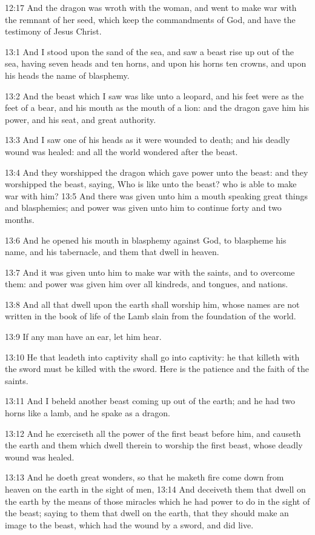 12:17 And the dragon was wroth with the woman, and went to make war
with the remnant of her seed, which keep the commandments of God, and
have the testimony of Jesus Christ.

13:1 And I stood upon the sand of the sea, and saw a beast rise up out
of the sea, having seven heads and ten horns, and upon his horns ten
crowns, and upon his heads the name of blasphemy.

13:2 And the beast which I saw was like unto a leopard, and his feet
were as the feet of a bear, and his mouth as the mouth of a lion: and
the dragon gave him his power, and his seat, and great authority.

13:3 And I saw one of his heads as it were wounded to death; and his
deadly wound was healed: and all the world wondered after the beast.

13:4 And they worshipped the dragon which gave power unto the beast:
and they worshipped the beast, saying, Who is like unto the beast? who
is able to make war with him?  13:5 And there was given unto him a
mouth speaking great things and blasphemies; and power was given unto
him to continue forty and two months.

13:6 And he opened his mouth in blasphemy against God, to blaspheme
his name, and his tabernacle, and them that dwell in heaven.

13:7 And it was given unto him to make war with the saints, and to
overcome them: and power was given him over all kindreds, and tongues,
and nations.

13:8 And all that dwell upon the earth shall worship him, whose names
are not written in the book of life of the Lamb slain from the
foundation of the world.

13:9 If any man have an ear, let him hear.

13:10 He that leadeth into captivity shall go into captivity: he that
killeth with the sword must be killed with the sword. Here is the
patience and the faith of the saints.

13:11 And I beheld another beast coming up out of the earth; and he
had two horns like a lamb, and he spake as a dragon.

13:12 And he exerciseth all the power of the first beast before him,
and causeth the earth and them which dwell therein to worship the
first beast, whose deadly wound was healed.

13:13 And he doeth great wonders, so that he maketh fire come down
from heaven on the earth in the sight of men, 13:14 And deceiveth them
that dwell on the earth by the means of those miracles which he had
power to do in the sight of the beast; saying to them that dwell on
the earth, that they should make an image to the beast, which had the
wound by a sword, and did live.

